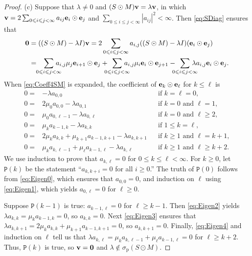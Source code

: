 \documentclass[10pt,reqno]{amsart}
\newcommand{\0}{{\color{lightgray}0}}
\renewcommand{\leq}{\leqslant}
\renewcommand{\geq}{\geqslant}
\renewcommand{\vec}[1]{{\bf #1}}
\theoremstyle{definition}
\numberwithin{equation}{section}
\begin{document}
\begin{proof}
\medskip\noindent(c) Suppose that $\lambda \neq 0$ and $(S \odot M) \vec{v} = \lambda \vec{v}$, in which
$\vec{v} = 2\sum_{0 \leq i \leq j< \infty} a_{ij} \vec{e}_i \odot \vec{e}_j$ and
$\sum_{0\leq i \leq j < \infty} | a_{ij}|^2 < \infty$.  Then \eqref{eq:SDiag} ensures that
\begin{align}
\vec{0} 
&= ((S \odot M) -\lambda I ) \vec{v}
= 2\sum_{0 \leq i \leq j< \infty} a_{i,j} ((S \odot M) -\lambda I )(\vec{e}_i\odot \vec{e}_j) \\
&=\!\!\sum_{0 \leq i \leq j< \infty} \!\!\!\! \!\! a_{i,j}\mu_j \vec{e}_{i+1}\odot{\vec{e}_j}
+ \!\!\!\!  \sum_{0 \leq i \leq j< \infty}  \!\!\!\!\!\!  a_{i,j}\mu_i \vec{e}_i\odot \vec{e}_{j+1} 
-  \!\!\!\!  \sum_{0 \leq i \leq j< \infty}  \!\!\!\! \!\! \lambda a_{i,j}{\vec{e}_i}\odot{\vec{e}_j} .\label{eq:Coeff4SM}
\end{align}
When \eqref{eq:Coeff4SM} is expanded, the coefficient of $\vec{e}_k \odot \vec{e}_{\ell}$ for $k \leq \ell$ is
\begin{align}
	0=&-\lambda a_{0,0}&& \text{if $k = \ell = 0$}, \label{eq:Eigen0}\\
    0=& 2\mu_0 a_{0, 0} -\lambda a_{0,1} &&\text{if $k=0$ and $\ell = 1$}, \label{eq:EigenX}\\
    0=& \mu_0 a_{0, \ell-1} -\lambda a_{0,\ell} &&\text{if $k=0$ and $\ell \geq 2$}, \label{eq:Eigen1}\\
    0=&\mu_k a_{k-1, k} - \lambda a_{k,k}  &&\text{if $1 \leq k=\ell$}, \label{eq:Eigen2}\\
     0=&2\mu_k a_{k, k}  + \mu_{k+1} a_{k-1, k+1}  -\lambda a_{k,k+1}&&\text{if $k \geq 1$ and $\ell = k+1$}, \label{eq:Eigen3}\\
    0=&\mu_{k} a_{k, \ell-1}  + \mu_{\ell} a_{k-1, \ell} - \lambda a_{k,\ell} &&\text{if $k \geq 1$ and $\ell \geq k+2$}.\label{eq:Eigen4}
\end{align}
We use induction to prove that $a_{k,\ell} = 0$ for $0 \leq k \leq \ell< \infty$.
For $k \geq0$, let $\texttt{P}(k)$ be the statement ``$a_{k, k+i} = 0$ for all $i \geq 0$.'' 
The truth of $\texttt{P}(0)$ follows from \eqref{eq:Eigen0}, which ensures that $a_{0,0}=0$, and
induction on $\ell$ using \eqref{eq:Eigen1}, which yields $a_{0,\ell} = 0$ for $\ell \geq 0$.

Suppose $\texttt{P}(k-1)$ is true: $a_{k-1,\ell} = 0$ for $\ell \geq k-1$.
Then \eqref{eq:Eigen2} yields
$\lambda a_{k,k} = \mu_{k} a_{k-1,k} = 0$, so $a_{k,k}=0$.
Next \eqref{eq:Eigen3} ensures that
$\lambda a_{k,k+1} =2 \mu_{k} a_{k,k}  + \mu_{k+1} a_{k-1,k+1} = 0$, so $a_{k,k+1}=0$.
Finally, \eqref{eq:Eigen4} and induction on $\ell$ tell us that
$\lambda a_{k,\ell} = \mu_{k} a_{k, \ell-1}  + \mu_{\ell} a_{k-1, \ell} = 0$ for $\ell \geq k+2$.
Thus, $\texttt{P}(k)$ is true, so $\vec{v} = \vec{0}$ and $\lambda \notin \sigma_{\textrm{p}}(S \odot M)$.
\end{proof}
\end{document}
